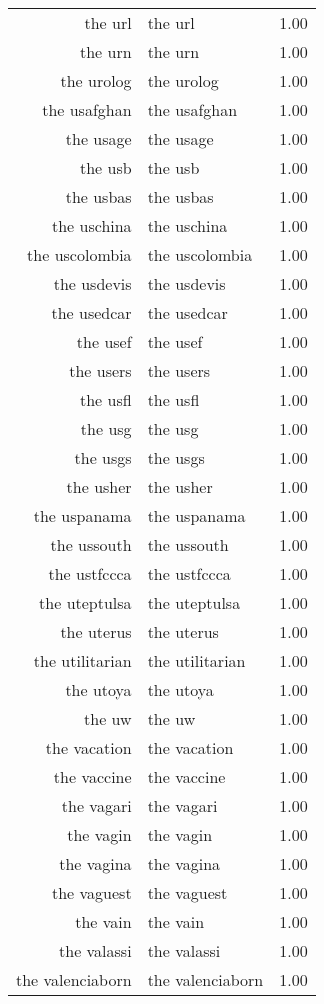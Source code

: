 \begin{table}[ht]
\begin{tabular}{rlr}
  the url & the url & 1.00 \\ 
  the urn & the urn & 1.00 \\ 
  the urolog & the urolog & 1.00 \\ 
  the usafghan & the usafghan & 1.00 \\ 
  the usage & the usage & 1.00 \\ 
  the usb & the usb & 1.00 \\ 
  the usbas & the usbas & 1.00 \\ 
  the uschina & the uschina & 1.00 \\ 
  the uscolombia & the uscolombia & 1.00 \\ 
  the usdevis & the usdevis & 1.00 \\ 
  the usedcar & the usedcar & 1.00 \\ 
  the usef & the usef & 1.00 \\ 
  the users & the users & 1.00 \\ 
  the usfl & the usfl & 1.00 \\ 
  the usg & the usg & 1.00 \\ 
  the usgs & the usgs & 1.00 \\ 
  the usher & the usher & 1.00 \\ 
  the uspanama & the uspanama & 1.00 \\ 
  the ussouth & the ussouth & 1.00 \\ 
  the ustfccca & the ustfccca & 1.00 \\ 
  the uteptulsa & the uteptulsa & 1.00 \\ 
  the uterus & the uterus & 1.00 \\ 
  the utilitarian & the utilitarian & 1.00 \\ 
  the utoya & the utoya & 1.00 \\ 
  the uw & the uw & 1.00 \\ 
  the vacation & the vacation & 1.00 \\ 
  the vaccine & the vaccine & 1.00 \\ 
  the vagari & the vagari & 1.00 \\ 
  the vagin & the vagin & 1.00 \\ 
  the vagina & the vagina & 1.00 \\ 
  the vaguest & the vaguest & 1.00 \\ 
  the vain & the vain & 1.00 \\ 
  the valassi & the valassi & 1.00 \\ 
  the valenciaborn & the valenciaborn & 1.00 \\ 

\end{tabular}
\end{table}
